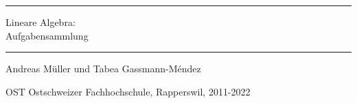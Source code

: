 %
%
%
\rhead{}
\frontmatter
\newcommand\HRule{\noindent\rule{\linewidth}{1.5pt}}
\begin{titlepage}
\HRule
\vspace*{2pt}
\begin{flushright}
{\Huge
Lineare Algebra:\\
\bigskip
Aufgabensammlung}
\end{flushright}
\HRule
\begin{flushright}
\vspace{30pt}
\LARGE
Andreas Müller
und
Tabea Gassmann-Méndez
\end{flushright}
\begin{center}
OST Ostschweizer Fachhochschule, Rapperswil, 2011-2022
\end{center}
\end{titlepage}
\tableofcontents
